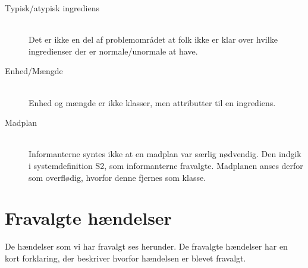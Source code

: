 \begin{description}
\item[Typisk/atypisk ingrediens] \hfill \\
Det er ikke en del af problemområdet at folk ikke er klar over hvilke ingredienser der er normale/unormale at have.

\item[Enhed/Mængde] \hfill \\
Enhed og mængde er ikke klasser, men attributter til en ingrediens.

\item[Madplan] \hfill \\
Informanterne syntes ikke at en madplan var særlig nødvendig. Den indgik i systemdefinition S2, som informanterne fravalgte. Madplanen anses derfor som overflødig, hvorfor denne fjernes som klasse.
\end{description}

\section{Fravalgte hændelser}
De hændelser som vi har fravalgt ses herunder. De fravalgte hændelser har en kort forklaring, der beskriver hvorfor hændelsen er blevet fravalgt.

